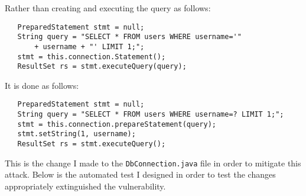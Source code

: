 Rather than creating and executing the query as follows:
\begin{verbatim}
   PreparedStatement stmt = null;
   String query = "SELECT * FROM users WHERE username='"
       + username + "' LIMIT 1;";
   stmt = this.connection.Statement();
   ResultSet rs = stmt.executeQuery(query);
\end{verbatim}
It is done as follows:
\begin{verbatim}
   PreparedStatement stmt = null;
   String query = "SELECT * FROM users WHERE username=? LIMIT 1;";
   stmt = this.connection.prepareStatement(query);
   stmt.setString(1, username);
   ResultSet rs = stmt.executeQuery();
\end{verbatim}
This is the change I made to the \verb|DbConnection.java| file in order to mitigate this attack. Below is the automated test I designed in order to test the changes appropriately extinguished the
vulnerability.
